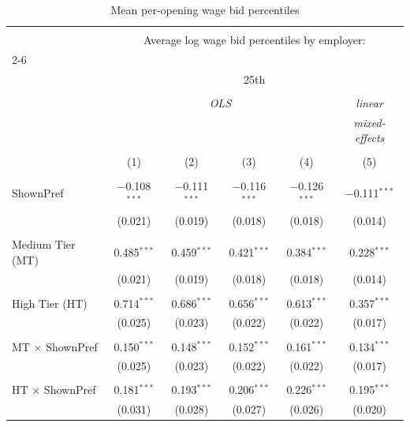 
\begin{table}[!htbp] \centering 
  \caption{Mean per-opening wage bid percentiles} 
  \label{tab:wage_bid_percentiles} 
\begin{tabular}{@{\extracolsep{5pt}}lccccc} 
\\[-1.8ex]\hline 
\hline \\[-1.8ex] 
 & \multicolumn{5}{c}{Average log wage bid percentiles by employer:} \\ 
\cline{2-6} 
\\[-1.8ex] & \multicolumn{5}{c}{25th} \\ 
\\[-1.8ex] & \multicolumn{4}{c}{\textit{OLS}} & \textit{linear} \\ 
 & \multicolumn{4}{c}{\textit{}} & \textit{mixed-effects} \\ 
\\[-1.8ex] & (1) & (2) & (3) & (4) & (5)\\ 
\hline \\[-1.8ex] 
 ShownPref & $-$0.108$^{***}$ & $-$0.111$^{***}$ & $-$0.116$^{***}$ & $-$0.126$^{***}$ & $-$0.111$^{***}$ \\ 
  & (0.021) & (0.019) & (0.018) & (0.018) & (0.014) \\ 
  & & & & & \\ 
 Medium Tier (MT) & 0.485$^{***}$ & 0.459$^{***}$ & 0.421$^{***}$ & 0.384$^{***}$ & 0.228$^{***}$ \\ 
  & (0.021) & (0.019) & (0.018) & (0.018) & (0.014) \\ 
  & & & & & \\ 
 High Tier (HT) & 0.714$^{***}$ & 0.686$^{***}$ & 0.656$^{***}$ & 0.613$^{***}$ & 0.357$^{***}$ \\ 
  & (0.025) & (0.023) & (0.022) & (0.022) & (0.017) \\ 
  & & & & & \\ 
 MT $\times$ ShownPref & 0.150$^{***}$ & 0.148$^{***}$ & 0.152$^{***}$ & 0.161$^{***}$ & 0.134$^{***}$ \\ 
  & (0.025) & (0.023) & (0.022) & (0.022) & (0.017) \\ 
  & & & & & \\ 
 HT $\times$ ShownPref & 0.181$^{***}$ & 0.193$^{***}$ & 0.206$^{***}$ & 0.226$^{***}$ & 0.195$^{***}$ \\ 
  & (0.031) & (0.028) & (0.027) & (0.026) & (0.020) \\ 

\end{tabular}
\end{table}

